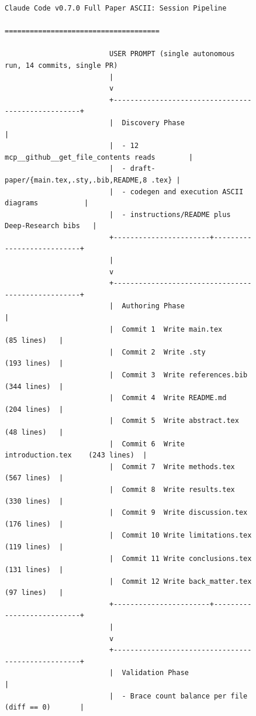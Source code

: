 \begin{figure}[H]
\vspace{-0.25cm}
\centering
\begin{Verbatim}[fontsize=\scriptsize]
                       Claude Code v0.7.0 Full Paper ASCII: Session Pipeline
                                    =====================================

                         USER PROMPT (single autonomous run, 14 commits, single PR)
                         |
                         v
                         +---------------------------------------------------+
                         |  Discovery Phase                                  |
                         |  - 12 mcp__github__get_file_contents reads        |
                         |  - draft-paper/{main.tex,.sty,.bib,README,8 .tex} |
                         |  - codegen and execution ASCII diagrams           |
                         |  - instructions/README plus  Deep-Research bibs   |
                         +-----------------------+---------------------------+
                         |
                         v
                         +---------------------------------------------------+
                         |  Authoring Phase                                  |
                         |  Commit 1  Write main.tex            (85 lines)   |
                         |  Commit 2  Write .sty                (193 lines)  |
                         |  Commit 3  Write references.bib      (344 lines)  |
                         |  Commit 4  Write README.md           (204 lines)  |
                         |  Commit 5  Write abstract.tex        (48 lines)   |
                         |  Commit 6  Write introduction.tex    (243 lines)  |
                         |  Commit 7  Write methods.tex         (567 lines)  |
                         |  Commit 8  Write results.tex         (330 lines)  |
                         |  Commit 9  Write discussion.tex      (176 lines)  |
                         |  Commit 10 Write limitations.tex     (119 lines)  |
                         |  Commit 11 Write conclusions.tex     (131 lines)  |
                         |  Commit 12 Write back_matter.tex     (97 lines)   |
                         +-----------------------+---------------------------+
                         |
                         v
                         +---------------------------------------------------+
                         |  Validation Phase                                 |
                         |  - Brace count balance per file (diff == 0)       |

\end{Verbatim}
\end{figure}
